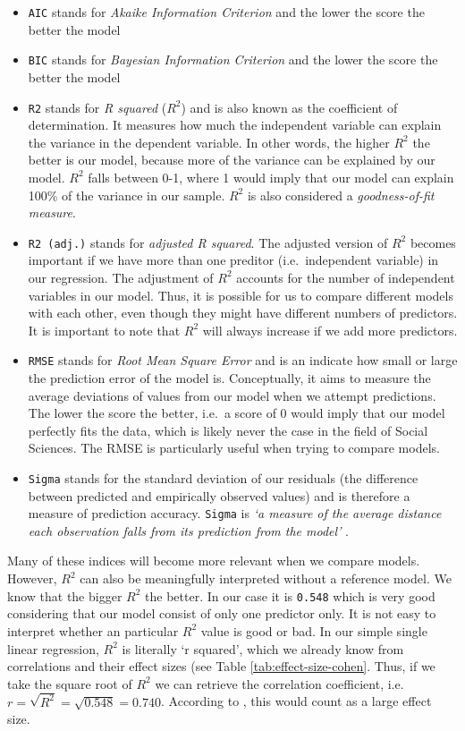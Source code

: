 \documentclass[
]{book}
\begin{document}
\begin{itemize}
\item
  \texttt{AIC} stands for \emph{Akaike Information Criterion} and the lower the score the better the model
\item
  \texttt{BIC} stands for \emph{Bayesian Information Criterion} and the lower the score the better the model
\item
  \texttt{R2} stands for \emph{R squared} (\(R^2\)) and is also known as the coefficient of determination. It measures how much the independent variable can explain the variance in the dependent variable. In other words, the higher \(R^2\) the better is our model, because more of the variance can be explained by our model. \(R^2\) falls between 0-1, where 1 would imply that our model can explain 100\% of the variance in our sample. \(R^2\) is also considered a \emph{goodness-of-fit measure}.
\item
  \texttt{R2\ (adj.)} stands for \emph{adjusted R squared}. The adjusted version of \(R^2\) becomes important if we have more than one preditor (i.e.~independent variable) in our regression. The adjustment of \(R^2\) accounts for the number of independent variables in our model. Thus, it is possible for us to compare different models with each other, even though they might have different numbers of predictors. It is important to note that \(R^2\) will always increase if we add more predictors.
\item
  \texttt{RMSE} stands for \emph{Root Mean Square Error} and is an indicate how small or large the prediction error of the model is. Conceptually, it aims to measure the average deviations of values from our model when we attempt predictions. The lower the score the better, i.e.~a score of 0 would imply that our model perfectly fits the data, which is likely never the case in the field of Social Sciences. The RMSE is particularly useful when trying to compare models.
\item
  \texttt{Sigma} stands for the standard deviation of our residuals (the difference between predicted and empirically observed values) and is therefore a measure of prediction accuracy. \texttt{Sigma} is \emph{`a measure of the average distance each observation falls from its prediction from the model'} \citep[p.~168]{gelman2020regression}.
\end{itemize}

Many of these indices will become more relevant when we compare models. However, \(R^2\) can also be meaningfully interpreted without a reference model. We know that the bigger \(R^2\) the better. In our case it is \texttt{0.548} which is very good considering that our model consist of only one predictor only. It is not easy to interpret whether an particular \(R^2\) value is good or bad. In our simple single linear regression, \(R^2\) is literally `r squared', which we already know from correlations and their effect sizes (see Table \ref{tab:effect-size-cohen}. Thus, if we take the square root of \(R^2\) we can retrieve the correlation coefficient, i.e.~\(r = \sqrt{R^2} = \sqrt{0.548} = 0.740\). According to \citet{cohen1988statistical}, this would count as a large effect size.
\end{document}
